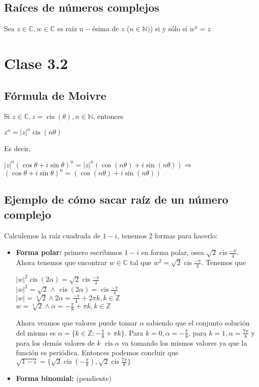 \documentclass{article}
\DeclareMathOperator\cis{cis}
\begin{document}
\subsection{Raíces de números complejos}
Sea $z\in \mathbb{C}, w\in \mathbb{C}$ es raíz $n-$ésima de $z$ ($n\in \mathbb{N})$) si y sólo si $w^n=z$

\section{Clase 3.2}

\subsection{Fórmula de Moivre}
Si $z\in \mathbb{C}, z=\cis{(\theta)}, n \in \mathbb{N}$, entonces
\begin{center}
    $z^n=|z|^n\cis{(n\theta)}$
\end{center}
Es decir,
\begin{center}
    $|z|^n(\cos{\theta}+i\sin{\theta})^n=|z|^n(\cos{(n\theta)}+i\sin{(n\theta)}) \Longrightarrow$ \\
    $(\cos{\theta}+i\sin{\theta})^n=(\cos{(n\theta)}+i\sin{(n\theta)})$
\end{center}

\subsection{Ejemplo de cómo sacar raíz de un número complejo}
Calculemos la raíz cuadrada de $1-i$, tenemos 2 formas para hacerlo:
\begin{itemize}
    \item \textbf{Forma polar:} primero escribimos $1-i$ en forma polar, osea $\sqrt{2}\cis{\frac{-\pi}{4}}$. Ahora tenemos que encontrar $w\in \mathbb{C}$ tal que $w^2=\sqrt{2}\cis{\frac{-\pi}{4}}$. Tenemos que
        \begin{center}
            $|w|^2\cis{(2\alpha)}=\sqrt{2}\cis{\frac{-\pi}{4}}$ \\
            $|w|^2=\sqrt{2}$ $\wedge$ $\cis{(2\alpha)}=\cis{\frac{-\pi}{4}}$ \\
            $|w|=\sqrt[4]{2} \wedge 2\alpha = \frac{-\pi}{4} +2 \pi k ,k \in \mathbb{Z}$\\
            $w=\sqrt[4]{2} \wedge \alpha= -\frac{\pi}{8}+\pi k,k\in\mathbb{Z}$
        \end{center}
    Ahora veamos que valores puede tomar $\alpha$ sabiendo que el conjunto solución del mismo es $\alpha=\{k\in \mathbb{Z}:-\frac{\pi}{8}+\pi k  \}$. Para $k=0,\alpha=-\frac{\pi}{8}$, para $k=1, \alpha=\frac{7\pi}{8}$ y para los demás valores de $k$ $\cis{\alpha}$ va tomando los mismos valores ya que la función es periódica. Entonces podemos concluir que$\sqrt{1-i}=\{ \sqrt{2}\cis{(-\frac{\pi}{8})}, \sqrt{2}\cis{\frac{7\pi}{8}} \}$     
    
    \item \textbf{Forma binomial:} (pendiente) %
\end{itemize}
\end{document}
